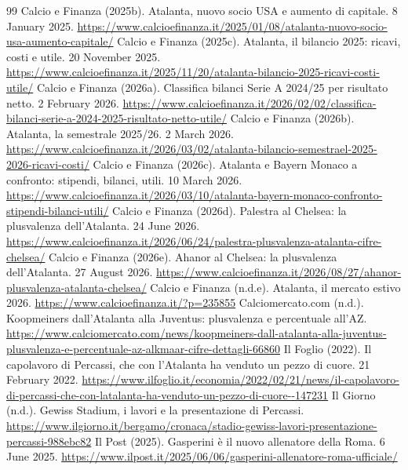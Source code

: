 \documentclass[11pt,a4paper]{article}
\begin{document}
\begin{thebibliography}{99}
 Calcio e Finanza (2025b). Atalanta, nuovo socio USA e aumento di capitale. 8 January 2025. \url{https://www.calcioefinanza.it/2025/01/08/atalanta-nuovo-socio-usa-aumento-capitale/}
 Calcio e Finanza (2025c). Atalanta, il bilancio 2025: ricavi, costi e utile. 20 November 2025. \url{https://www.calcioefinanza.it/2025/11/20/atalanta-bilancio-2025-ricavi-costi-utile/}
 Calcio e Finanza (2026a). Classifica bilanci Serie A 2024/25 per risultato netto. 2 February 2026. \url{https://www.calcioefinanza.it/2026/02/02/classifica-bilanci-serie-a-2024-2025-risultato-netto-utile/}
 Calcio e Finanza (2026b). Atalanta, la semestrale 2025/26. 2 March 2026. \url{https://www.calcioefinanza.it/2026/03/02/atalanta-bilancio-semestrael-2025-2026-ricavi-costi/}
 Calcio e Finanza (2026c). Atalanta e Bayern Monaco a confronto: stipendi, bilanci, utili. 10 March 2026. \url{https://www.calcioefinanza.it/2026/03/10/atalanta-bayern-monaco-confronto-stipendi-bilanci-utili/}
 Calcio e Finanza (2026d). Palestra al Chelsea: la plusvalenza dell'Atalanta. 24 June 2026. \url{https://www.calcioefinanza.it/2026/06/24/palestra-plusvalenza-atalanta-cifre-chelsea/}
 Calcio e Finanza (2026e). Ahanor al Chelsea: la plusvalenza dell'Atalanta. 27 August 2026. \url{https://www.calcioefinanza.it/2026/08/27/ahanor-plusvalenza-atalanta-chelsea/}
 Calcio e Finanza (n.d.e). Atalanta, il mercato estivo 2026. \url{https://www.calcioefinanza.it/?p=235855}
 Calciomercato.com (n.d.). Koopmeiners dall'Atalanta alla Juventus: plusvalenza e percentuale all'AZ. \url{https://www.calciomercato.com/news/koopmeiners-dall-atalanta-alla-juventus-plusvalenza-e-percentuale-az-alkmaar-cifre-dettagli-66860}
 Il Foglio (2022). Il capolavoro di Percassi, che con l'Atalanta ha venduto un pezzo di cuore. 21 February 2022. \url{https://www.ilfoglio.it/economia/2022/02/21/news/il-capolavoro-di-percassi-che-con-latalanta-ha-venduto-un-pezzo-di-cuore--147231}
 Il Giorno (n.d.). Gewiss Stadium, i lavori e la presentazione di Percassi. \url{https://www.ilgiorno.it/bergamo/cronaca/stadio-gewiss-lavori-presentazione-percassi-988ebc82}
 Il Post (2025). Gasperini è il nuovo allenatore della Roma. 6 June 2025. \url{https://www.ilpost.it/2025/06/06/gasperini-allenatore-roma-ufficiale/}

\end{thebibliography}
\end{document}
